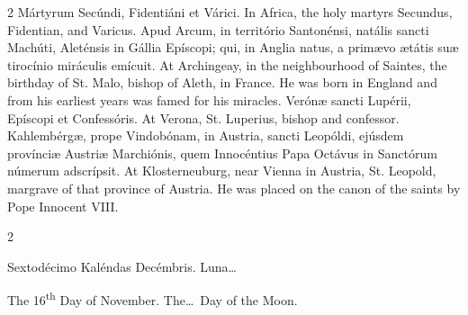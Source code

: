 \begin{paracol}{2}
 Mártyrum Secúndi, Fidentiáni et Várici.
\switchcolumn
{}
In Africa, the holy martyrs Secundus, 
 Fidentian, and Varicus.
\switchcolumn*
{}
Apud Arcum, in 
 território Santonénsi, natális sancti Machúti, Aleténsis in Gállia Epíscopi; 
 qui, in Anglia natus, a primævo ætátis suæ tirocínio miráculis emícuit.
\switchcolumn
{}
At Archingeay, in the neighbourhood 
 of Saintes, the birthday of St. Malo, bishop of Aleth, in France. He 
 was born in England and from his earliest years was famed for his miracles.
\switchcolumn*
{}
Verónæ sancti Lupérii, 
 Epíscopi et Confessóris.
\switchcolumn
{}
At Verona, St. Luperius, bishop and 
 confessor.
\switchcolumn*
{}
Kahlembérgæ, prope 
 Vindobónam, in Austria, sancti Leopóldi, ejúsdem provínciæ Austriæ 
 Marchiónis, quem Innocéntius Papa Octávus in Sanctórum númerum adscrípsit.
\switchcolumn
{}
At Klosterneuburg, near Vienna in 
 Austria, St. Leopold, margrave of that province of Austria. He was 
 placed on the canon of the saints by Pope Innocent VIII.
\switchcolumn*
{}
\end{paracol}


\begin{paracol}{2}
\begin{center}{\color{gregoriocolor} Sextodécimo Kaléndas Decémbris. 
 Luna\dots\ }\end{center}
\switchcolumn
{}
\begin{center}{\color{gregoriocolor} The 
 16\textsuperscript{th} Day of 
 November. The\dots\ Day of the Moon.}\end{center}
\end{paracol}

